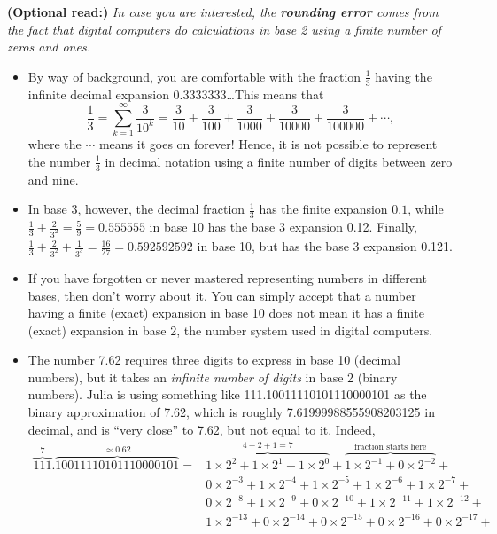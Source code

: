 \textbf{(Optional read:)} \emph{In case you are interested, the \textbf{rounding error} comes from the fact that digital computers do calculations in base 2 using a finite number of zeros and ones.} 
\begin{itemize}
    \item By way of background, you are comfortable with the fraction $\frac{1}{3}$ having the infinite decimal expansion 0.3333333\ldots This means that 
    $$\frac{1}{3} = \sum_{k=1}^\infty\frac{3}{10^k} = \frac{3}{10} + \frac{3}{100} + \frac{3}{1000} +  \frac{3}{10000} +  \frac{3}{100000} +\cdots,$$
    where the $\cdots$ means it goes on forever! Hence, it is not possible to represent the number $\frac{1}{3}$ in decimal notation using a finite number of digits between zero and nine. 
    \item In base 3, however, the decimal fraction $\frac{1}{3}$ has the finite expansion $0.1$, while  $\frac{1}{3} + \frac{2}{3^2} = \frac{5}{9} = 0.555555$ in base 10 has the base 3 expansion 0.12. Finally, $\frac{1}{3} + \frac{2}{3^2} + \frac{1}{3^3}= \frac{16}{27} = 0.592592592$ in base 10, but has the base 3 expansion 0.121.
    \item If you have forgotten or never mastered representing numbers in different bases, then don't worry about it. You can simply accept that a number having a finite (exact) expansion in base 10 does not mean it has a finite (exact) expansion in base 2, the number system used in digital computers.
    \item The number 7.62 requires three digits to express in base 10 (decimal numbers), but it takes an \emph{infinite number of digits} in base 2 (binary numbers). Julia is using something like 111.10011110101110000101 as the binary approximation of 7.62, which is roughly 7.61999988555908203125 in decimal, and is ``very close'' to 7.62, but not equal to it. Indeed, 
\begin{align*}
    \overbrace{111}^{7}.\overbrace{10 01111 01011 10000 101}^{\approx 0.62} =& \overbrace{1 \times 2^2 + 1 \times 2^1 + 1 \times 2^0}^{4 + 2 + 1 = 7} +  \overbrace{ 1 \times 2^{-1} + 0 \times 2^{-2}}^{\text{fraction starts here}} +\\
    &  0 \times 2^{-3} + 1 \times 2^{-4} + 1 \times 2^{-5} + 1 \times 2^{-6} + 1 \times 2^{-7} + \\
     &  0 \times 2^{-8} + 1 \times 2^{-9} + 0 \times 2^{-10} + 1 \times 2^{-11} + 1 \times 2^{-12} + \\
     &  1 \times 2^{-13} + 0 \times 2^{-14} + 0 \times 2^{-15} +0 \times 2^{-16} +0 \times 2^{-17} + \\

\end{align*}
\end{itemize}
